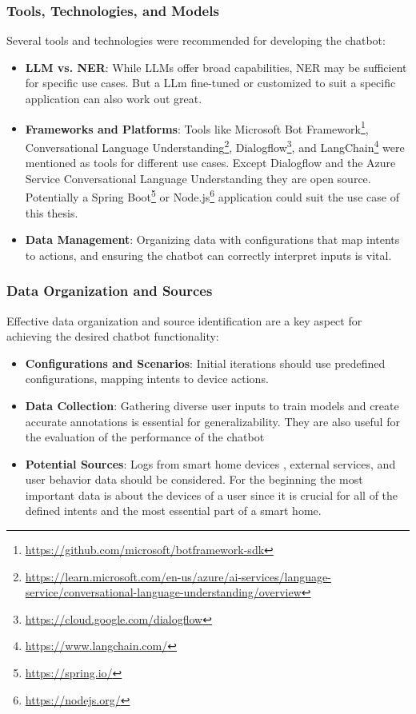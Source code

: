 \subsubsection{Tools, Technologies, and Models}

Several tools and technologies were recommended for developing the chatbot:

\begin{itemize}
    \item \textbf{LLM vs. NER}: While LLMs offer broad capabilities, NER may be sufficient for specific use cases. But a LLm fine-tuned or customized to suit a specific application can also work out great.
    \item \textbf{Frameworks and Platforms}:  Tools like Microsoft Bot Framework\footnote{\url{https://github.com/microsoft/botframework-sdk}}, Conversational Language Understanding\footnote{\url{https://learn.microsoft.com/en-us/azure/ai-services/language-service/conversational-language-understanding/overview}}, Dialogflow\footnote{\url{https://cloud.google.com/dialogflow}}, and LangChain\footnote{\url{https://www.langchain.com/}} were mentioned as tools for different use cases. Except Dialogflow and the Azure Service Conversational Language Understanding they are open source. Potentially a Spring Boot\footnote{\url{https://spring.io/}} or Node.js\footnote{\url{https://nodejs.org/}} application could suit the use case of this thesis.
    \item \textbf{Data Management}: Organizing data with configurations that map intents to actions, and ensuring the chatbot can correctly interpret inputs is vital.
\end{itemize}

\subsubsection{Data Organization and Sources}

Effective data organization and source identification are a key aspect for achieving the desired chatbot functionality:

\begin{itemize}
    \item \textbf{Configurations and Scenarios}: Initial iterations should use predefined configurations, mapping intents to device actions.
    \item \textbf{Data Collection}: Gathering diverse user inputs to train models and create accurate annotations is essential for generalizability. They are also useful for the evaluation of the performance of the chatbot
    \item \textbf{Potential Sources}: Logs from smart home devices , external services, and user behavior data should be considered. For the beginning the most important data is about the devices of a user since it is crucial for all of the defined intents and the most essential part of a smart home.
\end{itemize}

